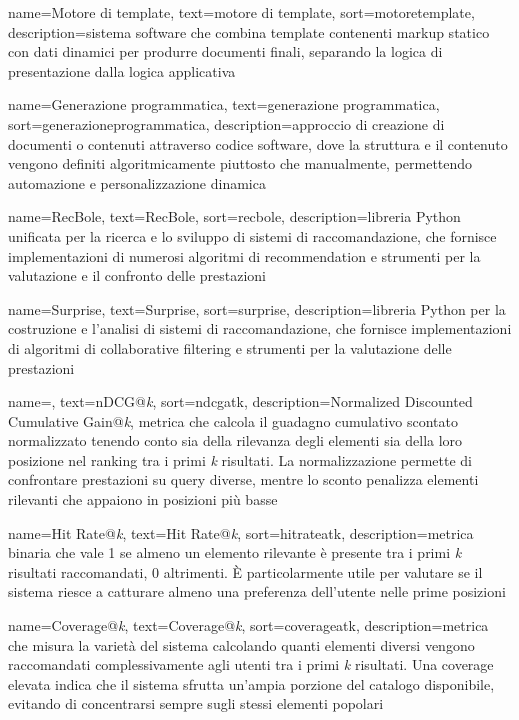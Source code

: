 {
    name=Motore di template,
    text=motore di template,
    sort=motoretemplate,
    description={sistema software che combina template contenenti markup statico con dati dinamici per produrre documenti finali, separando la logica di presentazione dalla logica applicativa}
}

 {
    name=Generazione programmatica,
    text=generazione programmatica,
    sort=generazioneprogrammatica,
    description={approccio di creazione di documenti o contenuti attraverso codice software, dove la struttura e il contenuto vengono definiti algoritmicamente piuttosto che manualmente, permettendo automazione e personalizzazione dinamica}
}

 {
    name=RecBole,
    text=RecBole,
    sort=recbole,
    description={libreria Python unificata per la ricerca e lo sviluppo di sistemi di raccomandazione, che fornisce implementazioni di numerosi algoritmi di recommendation e strumenti per la valutazione e il confronto delle prestazioni}
}

 {
    name=Surprise,
    text=Surprise,
    sort=surprise,
    description={libreria Python per la costruzione e l'analisi di sistemi di raccomandazione, che fornisce implementazioni di algoritmi di collaborative filtering e strumenti per la valutazione delle prestazioni}
}

 {
    name=,
    text=nDCG@\emph{k},
    sort=ndcgatk,
    description={Normalized Discounted Cumulative Gain@\emph{k}, metrica che calcola il guadagno cumulativo scontato normalizzato tenendo conto sia della rilevanza degli elementi sia della loro posizione nel ranking tra i primi \emph{k} risultati. La normalizzazione permette di confrontare prestazioni su query diverse, mentre lo sconto penalizza elementi rilevanti che appaiono in posizioni più basse}
}

 {
    name=Hit Rate@\emph{k},
    text=Hit Rate@\emph{k},
    sort=hitrateatk,
    description={metrica binaria che vale 1 se almeno un elemento rilevante è presente tra i primi \emph{k} risultati raccomandati, 0 altrimenti. È particolarmente utile per valutare se il sistema riesce a catturare almeno una preferenza dell'utente nelle prime posizioni}
}

 {
    name=Coverage@\emph{k},
    text=Coverage@\emph{k},
    sort=coverageatk,
    description={metrica che misura la varietà del sistema calcolando quanti elementi diversi vengono raccomandati complessivamente agli utenti tra i primi \emph{k} risultati. Una coverage elevata indica che il sistema sfrutta un'ampia porzione del catalogo disponibile, evitando di concentrarsi sempre sugli stessi elementi popolari}
}

